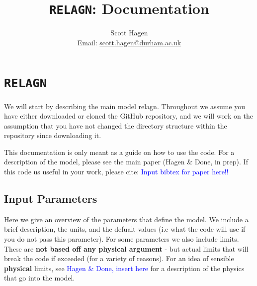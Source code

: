 \documentclass[a4paper, 11pt, times, onecolumn]{article}
\title{{\tt RELAGN}: Documentation}
\author{Scott Hagen \\ Email: \href{mailto:scott.hagen@durham.ac.uk}{scott.hagen@durham.ac.uk}}
\date{}
\begin{document}
\maketitle
\tableofcontents


\section{{\tt RELAGN}}

We will start by describing the main model {\sc relagn}. Throughout we assume you have either downloaded or cloned the GitHub repository, and we will work on the assumption that you have not changed the directory structure within the repository since downloading it.

This documentation is only meant as a guide on how to use the code. For a description of the model, please see the main paper (Hagen \& Done, in prep). If this code us useful in your work, please cite: \textcolor{blue}{Input bibtex for paper here!!}


\subsection{Input Parameters}

Here we give an overview of the parameters that define the model. We include a brief description, the units, and the defualt values (i.e what the code will use if you do not pass this parameter). For some parameters we also include limits. These are {\bf not based off any physical argument} - but actual limits that will break the code if exceeded (for a variety of reasons). For an idea of sensible {\bf physical} limits, see \textcolor{blue}{Hagen \& Done, insert here} for a description of the physics that go into the model.
\end{document}

